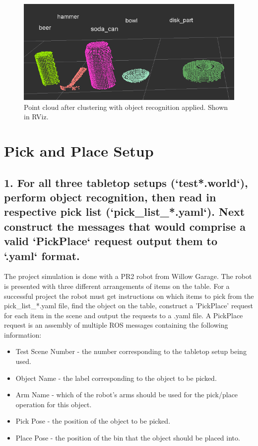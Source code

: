 \documentclass{article}
\begin{document}
\begin{figure}[H]
    \includegraphics[width=\linewidth]{classification.png}
    \caption{Point cloud after clustering with object recognition applied. Shown in RViz.}
    \label{fig:classification}
\end{figure}

\section{Pick and Place Setup}

\subsection{1. For all three tabletop setups (`test*.world`), perform object recognition, then read in respective pick list (`pick\_list\_*.yaml`). Next construct the messages that would comprise a valid `PickPlace` request output them to `.yaml` format.}

The project simulation is done with a PR2 robot from Willow Garage. The robot is presented with three different arrangements of items on the table. For a successful project the robot must get instructions on which items to pick from the pick\_list\_*.yaml file, find the object on the table, construct a 'PickPlace' request for each item in the scene and output the requests to a .yaml file. A PickPlace request is an assembly of multiple ROS messages containing the following information:
\begin{itemize}
    \item Test Scene Number - the number corresponding to the tabletop setup being used.
    \item Object Name - the label corresponding to the object to be picked.
    \item Arm Name - which of the robot's arms should be used for the pick/place operation for this object.
    \item Pick Pose - the position of the object to be picked.
    \item Place Pose - the position of the bin that the object should be placed into.
\end{itemize}
\end{document}
